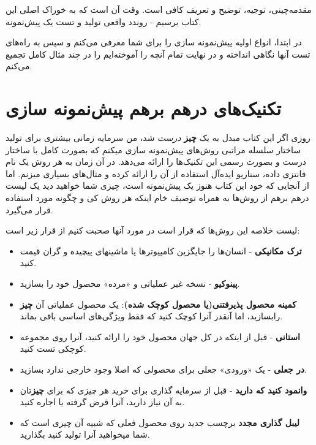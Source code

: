 مقدمه‌چینی، توجیه، توضیح و تعریف کافی است. وقت آن است که به خوراک اصلی
این کتاب برسیم - روندد واقعی تولید و تست یک پیش‌نمونه.

در ابتدا، انواع اولیه پیش‌نمونه سازی را برای شما معرفی می‌کنم و سپس به
راه‌های تست آنها نگاهی انداخته و در نهایت تمام آنچه را آموخته‌ایم را در
چند مثال کامل تجمیع می‌کنم.

\section{تکنیک‌های درهم برهم پیش‌نمونه
سازی}\label{ux62aux6a9ux646ux6ccux6a9ux647ux627ux6cc-ux62fux631ux647ux645-ux628ux631ux647ux645-ux67eux6ccux634ux646ux645ux648ux646ux647-ux633ux627ux632ux6cc}

روزی اگر این کتاب مبدل به یک \textbf{چیز} \emph{درست} شد، من سرمایه
زمانی بیشتری برای تولید ساختار سلسله مراتبی روش‌های پیش‌نمونه سازی میکنم
که بصورت کامل با ساختار درست و بصورت رسمی این تکنیک‌ها را ارائه می‌دهد.
در آن زمان به هر روش یک نام فانتزی داده، سناریو ایده‌آل استفاده از آن را
ارائه کرده و مثال‌های بسیاری میزنم. اما از آنجایی که خود این کتاب هنوز
یک پیش‌نمونه است، چیزی شما خواهید دید یک لیست درهم برهم از روش‌ها به
همراه توصیف خام اینکه هر روش کی و چگونه مورد استفاده قرار می‌گیرد.

لیست خلاصه این روش‌ها که قرار است در مورد آنها صحبت کنیم از قرار زیر
است:

\begin{itemize}
\item
  \textbf{ترک مکانیکی} - انسان‌ها را جایگزین کامپیوترها یا ماشینهای
  پیچیده و گران قیمت کنید.
\item
  \textbf{پینوکیو} - نسخه غیر عملیاتی و «مرده» محصول خود را بسازید.
\item
  \textbf{کمینه محصول پذیرفتنی(یا محصول کوچک شده)}: یک محصول عملیاتی آن
  \textbf{چیز} رابسازید، اما آنقدر آنرا کوچک کنید که فقط ویژگی‌‌های
  اساسی باقی بماند.
\item
  \textbf{استانی} - قبل از اینکه در کل جهان محصول خود را ارائه کنید،
  آنرا روی مجموعه کوچکی تست کنید.
\item
  \textbf{در جعلی} - یک «ورودی» جعلی برای محصولی که اصلا وجود خارجی
  ندارد بسازید.
\item
  \textbf{وانمود کنید که دارید} - قبل از سرمایه گذاری برای خرید هر چیزی
  که برای \textbf{چیز}تان به آن نیاز دارید، آنرا قرض گرفته یا اجاره
  کنید.
\item
  \textbf{لیبل گذاری مجدد} برچسب جدید روی محصول فعلی که شبیه آن چیزی است
  که شما میخواهید آنرا تولید کنید بگذارید.
\end{itemize}

